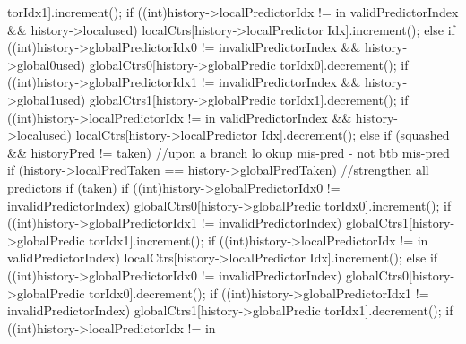 \begin{DoxyCode}
{{{{{      torIdx1].increment();
                                        if ((int)history->localPredictorIdx != in
      validPredictorIndex && history->localused)
                                                localCtrs[history->localPredictor
      Idx].increment();
                                } else {
                                        if ((int)history->globalPredictorIdx0 != 
      invalidPredictorIndex && history->global0used)
                                                globalCtrs0[history->globalPredic
      torIdx0].decrement();
                                        if ((int)history->globalPredictorIdx1 != 
      invalidPredictorIndex && history->global1used)
                                                globalCtrs1[history->globalPredic
      torIdx1].decrement();
                                        if ((int)history->localPredictorIdx != in
      validPredictorIndex && history->localused)
                                                localCtrs[history->localPredictor
      Idx].decrement();
                                }
                        }
                } else if (squashed && historyPred != taken) { //upon a branch lo
      okup mis-pred - not btb mis-pred
                        if (history->localPredTaken == history->globalPredTaken) 
      {
                                //strengthen all predictors
                                if (taken) {
                                        if ((int)history->globalPredictorIdx0 != 
      invalidPredictorIndex)
                                                globalCtrs0[history->globalPredic
      torIdx0].increment();
                                        if ((int)history->globalPredictorIdx1 != 
      invalidPredictorIndex)
                                                globalCtrs1[history->globalPredic
      torIdx1].increment();
                                        if ((int)history->localPredictorIdx != in
      validPredictorIndex)
                                                localCtrs[history->localPredictor
      Idx].increment();
                                } else {
                                        if ((int)history->globalPredictorIdx0 != 
      invalidPredictorIndex)
                                                globalCtrs0[history->globalPredic
      torIdx0].decrement();
                                        if ((int)history->globalPredictorIdx1 != 
      invalidPredictorIndex)
                                                globalCtrs1[history->globalPredic
      torIdx1].decrement();
                                        if ((int)history->localPredictorIdx != in
}}}}}
\end{DoxyCode}
